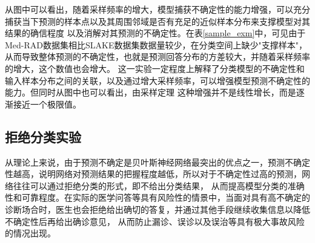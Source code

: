 从图中可以看出，随着采样频率的增大，模型捕获不确定性的能力增强，可以充分捕获当下预测的样本点以及其周围邻域是否有充足的近似样本分布来支撑模型对其结果的确信程度
以及消解对其预测的不确定性。在表\ref{sample_exm}中，可见由于Med-RAD数据集相比SLAKE数据集数据量较少，在分类空间上缺少"支撑样本"，从而导致整体预测的不确定性，也就是预测回答分布的方差较大，并随着采样频率的增大，这个数值也会增大。
这一实验一定程度上解释了分类模型的不确定性和输入样本分布之间的关联，以及通过增大采样频率，可以增强模型预测不确定性的能力。但同时从图中也可以看出，由采样定理
这种增强并不是线性增长，而是逐渐接近一个极限值。



\subsection{拒绝分类实验}
从理论上来说，由于预测不确定是贝叶斯神经网络最突出的优点之一，预测不确定性越高，说明网络对预测结果的把握程度越低，所以对于不确定性过高的预测，网络往往可以通过拒绝分类的形式，即不给出分类结果，
从而提高模型分类的准确性和可靠程度。在实际的医学问答等具有风险性的情景中，当面对具有高不确定的诊断场合时，医生也会拒绝给出确切的答复，并通过其他手段继续收集信息以降低不确定性后再给出确诊意见，
从而防止漏诊、误诊以及误治等具有极大事故风险的情况出现。

